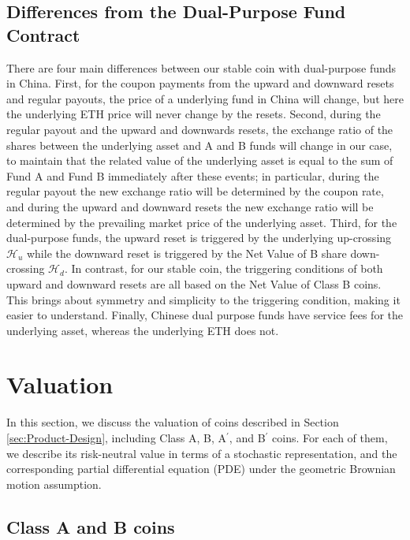 \documentclass[final,pdftex]{ectaart}
\newcommand{\Ap}{A\ensuremath{^\prime}\xspace}
\newcommand{\Bp}{B\ensuremath{^\prime}\xspace}
\theoremstyle{plain}
\begin{document}
\subsection{Differences from the Dual-Purpose Fund Contract}

There are four main differences between our stable coin with dual-purpose funds in China. First, for the coupon payments from the upward and downward resets and regular payouts, the price of a underlying fund in China will change, but here the underlying ETH price will never change by the resets. Second, during the regular payout and the upward and downwards resets, the exchange ratio of the shares between the underlying asset and A and B funds will change in our case, to maintain that the related value of the underlying asset is equal to
the sum of Fund A and Fund B immediately after these events; in particular, during the regular payout the new exchange ratio will be determined by the coupon rate, and during the upward and downward resets the new exchange ratio will be determined by the prevailing market price of the underlying asset. Third, for the dual-purpose funds, the upward reset is triggered by the underlying up-crossing $\mathcal{H}_u$ while the downward reset is triggered by the Net Value of B share down-crossing $\mathcal{H}_d$. In contrast, for our stable coin, the triggering conditions of both upward and downward resets are all based on the Net Value of Class B coins. This brings about symmetry and simplicity to the triggering condition, making it easier to understand. Finally, Chinese dual purpose funds have service fees for the underlying asset, whereas the underlying ETH does not.



\section{Valuation}\label{sect:valuation}

In this section, we discuss the valuation of coins described in Section \ref{sec:Product-Design}, including Class A, B, \Ap, and \Bp coins. For each of them, we describe its risk-neutral value in terms of a stochastic representation, and the corresponding partial differential equation (PDE) under the geometric Brownian motion assumption.

\subsection{Class A and B coins}
\end{document}

